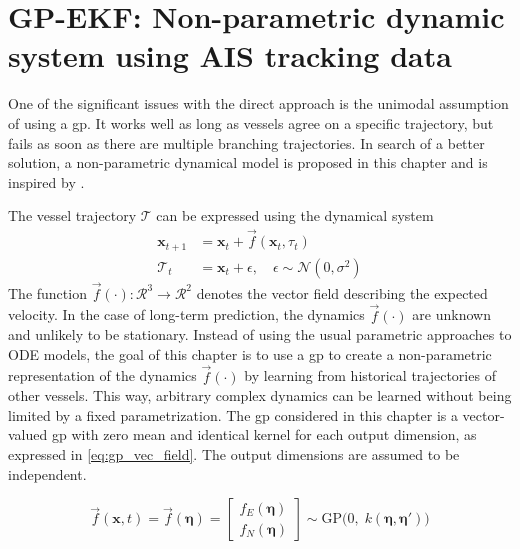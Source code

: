 \chapter{GP-EKF: Non-parametric dynamic system using AIS tracking data}\label{chap:gp_ekf}
One of the significant issues with the direct approach is the unimodal assumption of using a \acrshort{gp}. It works well as long as vessels agree on a specific trajectory, but fails as soon as there are multiple branching trajectories. In search of a better solution, a non-parametric dynamical model is proposed in this chapter and is inspired by \cite{pedestrian,gpekf,vehicle_gp_prediction,multistep_gp}.



The vessel trajectory $\boldsymbol{\mathcal{T}}$ can be expressed using the dynamical system
\begin{subequations}
    \begin{align}
        \boldsymbol{x}_{t+1}       & = \boldsymbol{x}_t + \vec{f}(\boldsymbol{x}_t,\tau_t)                       \\
        \boldsymbol{\mathcal{T}}_t & = \boldsymbol{x}_t + \epsilon, \quad \epsilon \sim \mathcal{N}(0, \sigma^2)
    \end{align}
\end{subequations}
The function $\vec{f}(\cdot): \mathcal{R}^3 \to \mathcal{R}^2$ denotes the vector field describing the expected velocity. In the case of long-term prediction, the dynamics $\vec{f}(\cdot)$ are unknown and unlikely to be stationary. Instead of using the usual parametric approaches to ODE models, the goal of this chapter is to use a \acrshort{gp} to create a non-parametric representation of the dynamics $\vec{f}(\cdot)$ by learning from historical trajectories of other vessels. This way, arbitrary complex dynamics can be learned without being limited by a fixed parametrization. The \acrshort{gp} considered in this chapter is a vector-valued \acrshort{gp} with zero mean and identical kernel for each output dimension, as expressed in \cref{eq:gp_vec_field}. The output dimensions are assumed to be independent.

\begin{equation}\label{eq:gp_vec_field}
    \vec{f}(\boldsymbol{x}, t) = \vec{f}(\boldsymbol{\eta}) = \begin{bmatrix} f_E (\boldsymbol{\eta})\\ f_N (\boldsymbol{\eta})\end{bmatrix} \sim \text{GP} \big(0 , \; k(\boldsymbol{\eta}, \boldsymbol{\eta}')\big)
\end{equation}


